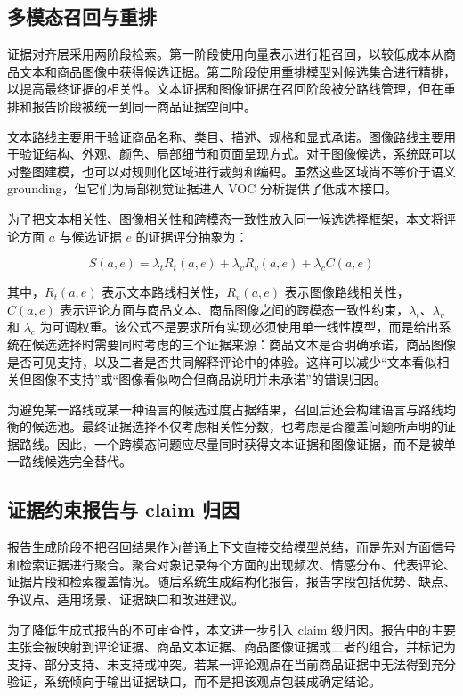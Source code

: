 \documentclass[11pt]{article}
\begin{document}
\subsection{多模态召回与重排}

证据对齐层采用两阶段检索。第一阶段使用向量表示进行粗召回，以较低成本从商品文本和商品图像中获得候选证据。第二阶段使用重排模型对候选集合进行精排，以提高最终证据的相关性。文本证据和图像证据在召回阶段被分路线管理，但在重排和报告阶段被统一到同一商品证据空间中。

文本路线主要用于验证商品名称、类目、描述、规格和显式承诺。图像路线主要用于验证结构、外观、颜色、局部细节和页面呈现方式。对于图像候选，系统既可以对整图建模，也可以对规则化区域进行裁剪和编码。虽然这些区域尚不等价于语义 grounding，但它们为局部视觉证据进入 VOC 分析提供了低成本接口。

为了把文本相关性、图像相关性和跨模态一致性放入同一候选选择框架，本文将评论方面 \(a\) 与候选证据 \(e\) 的证据评分抽象为：

\[
S(a,e) = \lambda_t R_t(a,e) + \lambda_v R_v(a,e) + \lambda_c C(a,e)
\]

其中，\(R_t(a,e)\) 表示文本路线相关性，\(R_v(a,e)\) 表示图像路线相关性，\(C(a,e)\) 表示评论方面与商品文本、商品图像之间的跨模态一致性约束，\(\lambda_t\)、\(\lambda_v\) 和 \(\lambda_c\) 为可调权重。该公式不是要求所有实现必须使用单一线性模型，而是给出系统在候选选择时需要同时考虑的三个证据来源：商品文本是否明确承诺，商品图像是否可见支持，以及二者是否共同解释评论中的体验。这样可以减少``文本看似相关但图像不支持''或``图像看似吻合但商品说明并未承诺''的错误归因。

为避免某一路线或某一种语言的候选过度占据结果，召回后还会构建语言与路线均衡的候选池。最终证据选择不仅考虑相关性分数，也考虑是否覆盖问题所声明的证据路线。因此，一个跨模态问题应尽量同时获得文本证据和图像证据，而不是被单一路线候选完全替代。

\subsection{证据约束报告与 claim 归因}

报告生成阶段不把召回结果作为普通上下文直接交给模型总结，而是先对方面信号和检索证据进行聚合。聚合对象记录每个方面的出现频次、情感分布、代表评论、证据片段和检索覆盖情况。随后系统生成结构化报告，报告字段包括优势、缺点、争议点、适用场景、证据缺口和改进建议。

为了降低生成式报告的不可审查性，本文进一步引入 claim 级归因。报告中的主要主张会被映射到评论证据、商品文本证据、商品图像证据或二者的组合，并标记为支持、部分支持、未支持或冲突。若某一评论观点在当前商品证据中无法得到充分验证，系统倾向于输出证据缺口，而不是把该观点包装成确定结论。
\end{document}

